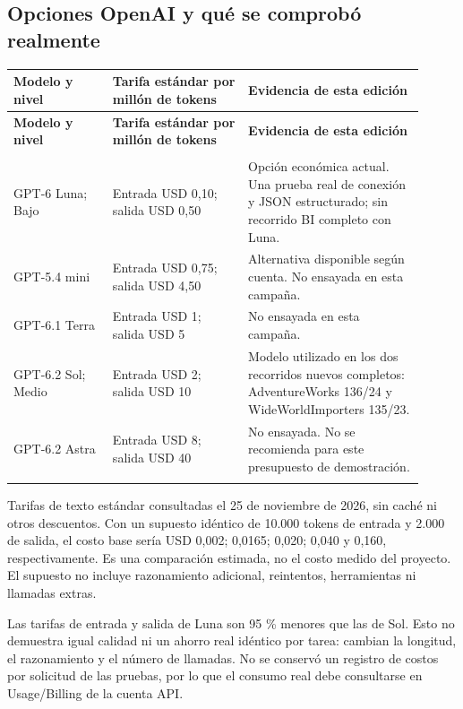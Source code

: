 \subsection{Opciones OpenAI y qué se comprobó realmente}
\begingroup
\fontsize{10}{12.5}\selectfont
\setlength{\tabcolsep}{5pt}
\renewcommand{\arraystretch}{1.15}
\begin{longtable}{@{}>{\RaggedRight\arraybackslash}p{0.22\linewidth}>{\RaggedRight\arraybackslash}p{0.3\linewidth}>{\RaggedRight\arraybackslash}p{0.39\linewidth}@{}}
\toprule
\textbf{Modelo y nivel} & \textbf{Tarifa estándar por millón de tokens} & \textbf{Evidencia de esta edición} \\
\midrule
\endfirsthead
\toprule
\textbf{Modelo y nivel} & \textbf{Tarifa estándar por millón de tokens} & \textbf{Evidencia de esta edición} \\
\midrule
\endhead
\midrule
\multicolumn{3}{r}{\footnotesize Continúa en la página siguiente}\\
\endfoot
\bottomrule
\endlastfoot
GPT-6 Luna; Bajo & Entrada USD 0,10; salida USD 0,50 & Opción económica actual. Una prueba real de conexión y JSON estructurado; sin recorrido BI completo con Luna. \\
\addlinespace[3pt]
GPT-5.4 mini & Entrada USD 0,75; salida USD 4,50 & Alternativa disponible según cuenta. No ensayada en esta campaña. \\
\addlinespace[3pt]
GPT-6.1 Terra & Entrada USD 1; salida USD 5 & No ensayada en esta campaña. \\
\addlinespace[3pt]
GPT-6.2 Sol; Medio & Entrada USD 2; salida USD 10 & Modelo utilizado en los dos recorridos nuevos completos: AdventureWorks 136/24 y WideWorldImporters 135/23. \\
\addlinespace[3pt]
GPT-6.2 Astra & Entrada USD 8; salida USD 40 & No ensayada. No se recomienda para este presupuesto de demostración. \\
\addlinespace[3pt]
\end{longtable}
\endgroup

Tarifas de texto estándar consultadas el 25 de noviembre de 2026, sin caché ni otros descuentos. Con un supuesto idéntico de 10.000 tokens de entrada y 2.000 de salida, el costo base sería USD 0,002; 0,0165; 0,020; 0,040 y 0,160, respectivamente. Es una comparación estimada, no el costo medido del proyecto. El supuesto no incluye razonamiento adicional, reintentos, herramientas ni llamadas extras.

Las tarifas de entrada y salida de Luna son 95 \% menores que las de Sol. Esto no demuestra igual calidad ni un ahorro real idéntico por tarea: cambian la longitud, el razonamiento y el número de llamadas. No se conservó un registro de costos por solicitud de las pruebas, por lo que el consumo real debe consultarse en Usage/Billing de la cuenta API.


